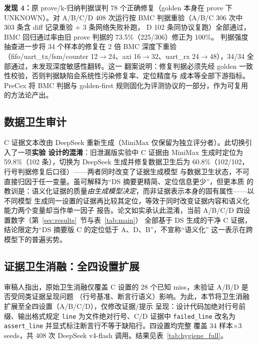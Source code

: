 \documentclass[twocolumn,10pt]{ctexart}
\begin{document}
\textbf{发现 4：}原 prove/k-归纳判据误判 78 个正确修复（golden 本身在 prove 下 UNKNOWN）。对
A/B/C/D 408 次运行按 BMC 判据重验（A/B/C 306 次中 303 条含 diff 记录重验 + 3 条网络失败补跑，
D 102 条同协议复跑）全部通过，BMC 回归通过率由旧 prove 判据的 73.5\%（225/306）修正为 100\%。
判据强度抽查进一步将 34 个样本的修复在 2 倍 BMC 深度下重验（fifo/uart\_tx/fsm/counter
12$\to$24、axi 16$\to$32、uart\_rx 24$\to$48），34/34 全部通过，未发现深度敏感性翻转。这一
翻案说明：修复判据必须先经 golden 一致性校验，否则判据缺陷会系统性污染修复率、定位精度与
成本等全部下游指标。PreCex 将 BMC 判据与 golden-first 规则固化为评测协议的一部分，作为可复用
的方法论产出。

\subsection{数据卫生审计}\label{sec:hygiene}

C 证据文本改由 DeepSeek 重新生成（MiniMax 仅保留为独立评分者）。此切换引入了一项\textbf{实验
设计的混淆}：旧泄漏版实验中 C 证据由 MiniMax 生成时定位为 59.8\%（102 条），切换为 DeepSeek
生成并修复数据卫生后为 60.8\%（102/102，行号判据修复后口径）——两者同时改变了证据生成模型
与数据卫生状态，不可直接归因于任一变量。虽可解释为“DS 摘要更精简、定位信息更少”，但更本质
的教训是：语义化证据的质量\textit{由生成模型决定}，而非证据表示本身的固有属性——以不同模型
生成同一设置的证据再比较其定位，等效于同时改变证据内容和语义化能力两个变量却当作单一因子
报告。论文如实承认此混淆，当前 A/B/C/D 四设置数字（第~\ref{sec:results}~节与表~\ref{tab:main}）
全部基于 DS 生成的干净 C 证据，结论限定为“DS 摘要版 C 的定位低于 A、D、B”，不宣称“语义化”
这一表示在跨模型下的普遍劣势。

\subsection{证据卫生消融：全四设置扩展}\label{sec:evidence-hygiene}

审稿人指出，原始卫生消融仅覆盖 C 设置的 28 个已知 miss，未验证 A/B/D 是否受同类证据呈现问题
（行号基准、断言行语义）影响。为此，本节将卫生消融扩展至全四设置（A/B/C/D），仅修改证据/提示
呈现：设计代码加绝对行号前缀、输出格式规定 \texttt{line} 为文件绝对行号、C/D 证据中
\texttt{failed\_line} 改名为 \texttt{assert\_line} 并显式标注断言行不等于缺陷行。四设置均完整
覆盖 34 样本$\times$3 seeds，共 408 次 DeepSeek v4-flash 调用。结果见表~\ref{tab:hygiene_full}。
\end{document}
